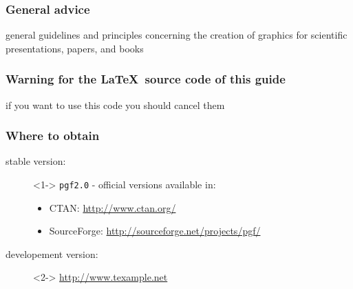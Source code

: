 \begin{frame}
    \frametitle{General advice}
    {
        \begin{center}
        \end{center}
        general guidelines and principles concerning the \alert{creation of graphics for scientific presentations, papers, and books}
    }
\end{frame}






\begin{frame}
    \frametitle{Warning for the \LaTeX\ source code of this guide}
    \begin{center}
    \end{center}
    if you want to use this code you should cancel them
\end{frame}





\begin{frame}
    \frametitle{Where to obtain \Tikz}
    \begin{description}
        \item[stable version:]<1-> \texttt{pgf2.0} - official versions available in:
            \vspace{0.3cm}
            \begin{itemize}
                \item<1-> CTAN: \url{http://www.ctan.org/}
                \vspace{0.1cm}
                \item<1-> SourceForge: \url{http://sourceforge.net/projects/pgf/}
            \end{itemize}
        \vspace{1.0cm}
        \item[developement version:]<2-> \url{http://www.texample.net}
    \end{description}
\end{frame}





